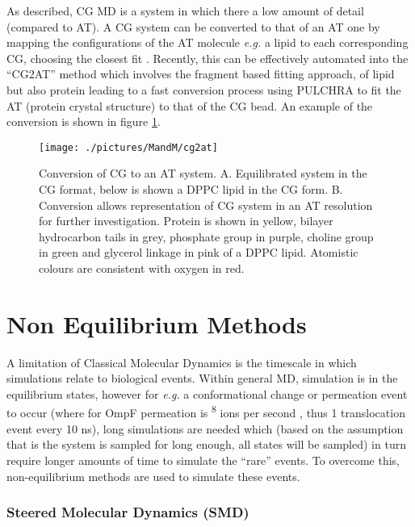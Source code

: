 As described, CG MD is a system in which there a low amount of detail (compared to AT). A CG system can be converted to that of an AT one by mapping the configurations of the AT molecule \textit{e.g.} a lipid to each corresponding CG, choosing the closest fit \cite{Carpenter2008}. Recently, this can be effectively automated into the ``CG2AT'' method  which involves the fragment based fitting approach, of lipid but also protein leading to a fast conversion process \cite{Stansfeld2011} using PULCHRA \cite{Rotkiewicz2008} to fit the AT (protein crystal structure) to that of the CG bead. An example of the conversion is shown in figure \ref{fig:cg2at}. 

\begin{figure}[H]
\begin{center}
\texttt{[image: ./pictures/MandM/cg2at]}
\caption[Conversion of CG to an AT system] {Conversion of CG to an AT system. A. Equilibrated system in the CG format, below is shown a DPPC lipid in the CG form. B. Conversion allows representation of CG system in an AT resolution for further investigation. Protein is shown in yellow, bilayer hydrocarbon tails in grey, phosphate group in purple, choline group in green and glycerol linkage in pink of a DPPC lipid. Atomistic colours are consistent with oxygen in red. }
\label{fig:cg2at}
\end{center}
\end{figure}


\section{Non Equilibrium Methods}

A limitation of Classical Molecular Dynamics is the timescale in which simulations relate to biological events. Within general MD, simulation is in the equilibrium states, however for \textit{e.g.} a conformational change or permeation event to occur (where for OmpF permeation is \textsuperscript{8} ions per second \cite{Suenaga1998}, thus 1 translocation event every 10 ns), long simulations are needed which (based on the assumption that is the system is sampled for long enough, all states will be sampled) in turn require longer amounts of time to simulate the ``rare'' events. To overcome this, non-equilibrium methods are used to simulate these events. 

\subsubsection*{Steered Molecular Dynamics (SMD)}

